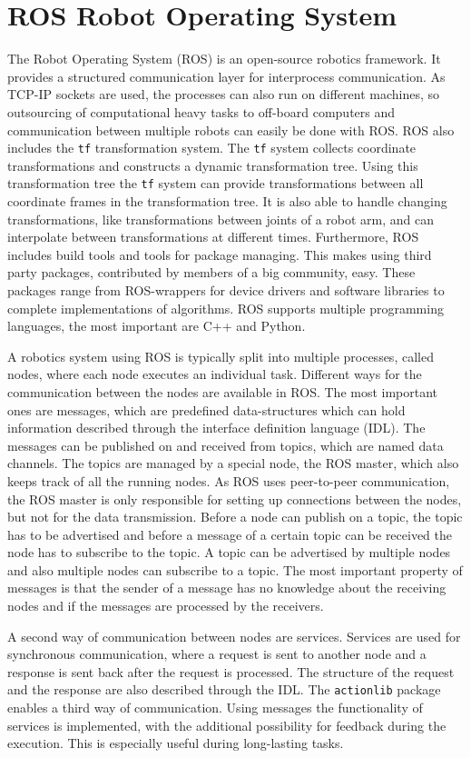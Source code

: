 \section{ROS Robot Operating System} \label{ROS}

The Robot Operating System (ROS) \cite{ROS} is an open-source robotics framework. It provides a structured communication layer for interprocess communication. As TCP-IP sockets are used, the processes can also run on different machines, so outsourcing of computational heavy tasks to off-board computers and communication between multiple robots can easily be done with ROS. ROS also includes the \texttt{tf} transformation system. The \texttt{tf} system collects coordinate transformations and constructs a dynamic transformation tree. Using this transformation tree the \texttt{tf} system can provide transformations between all coordinate frames in the transformation tree. It is also able to handle changing transformations, like transformations between joints of a robot arm, and can interpolate between transformations at different times. Furthermore, ROS includes build tools and tools for package managing. This makes using third party packages, contributed by members of a big community, easy. These packages range from ROS-wrappers for device drivers and software libraries to complete implementations of algorithms. ROS supports multiple programming languages, the most important are C++ and Python.

A robotics system using ROS is typically split into multiple processes, called nodes, where each node executes an individual task. Different ways for the communication between the nodes are available in ROS. The most important ones are messages, which are predefined data-structures which can hold information described through the interface definition language (IDL). The messages can be published on and received from topics, which are named data channels. The topics are managed by a special node, the ROS master, which also keeps track of all the running nodes. As ROS uses peer-to-peer communication, the ROS master is only responsible for setting up connections between the nodes, but not for the data transmission. Before a node can publish on a topic, the topic has to be advertised and before a message of a certain topic can be received the node has to subscribe to the topic. A topic can be advertised by multiple nodes and also multiple nodes can subscribe to a topic. The most important property of messages is that the sender of a message has no knowledge about the receiving nodes and if the messages are processed by the receivers.

A second way of communication between nodes are services. Services are used for synchronous communication, where a request is sent to another node and a response is sent back after the request is processed. The structure of the request and the response are also described through the IDL. The \texttt{actionlib} package enables a third way of communication. Using messages the functionality of services is implemented, with the additional possibility for feedback during the execution. This is especially useful during long-lasting tasks.